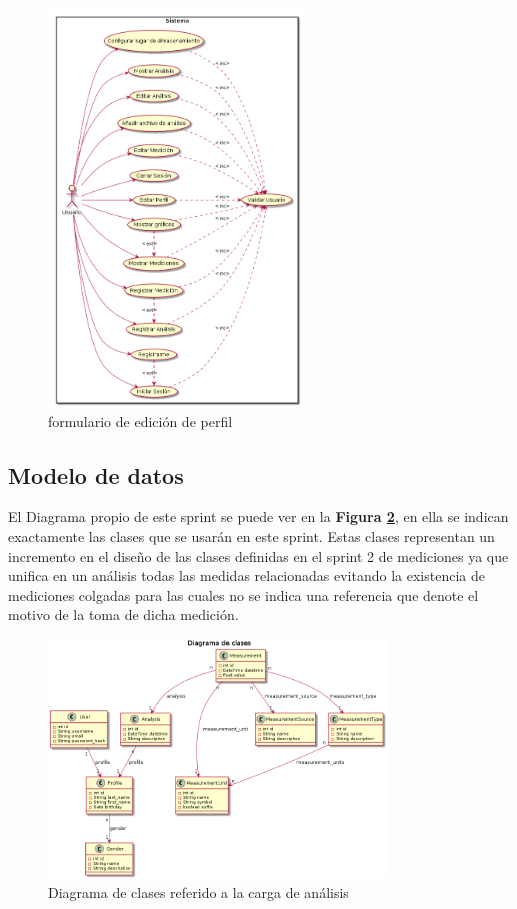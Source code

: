 \begin{figure}[h]
	\centering
	\includegraphics[width=0.6\textwidth]{img/6-cu}
	\caption{formulario de edición de perfil}
	\label{6-cu}
\end{figure}

\clearpage

\subsection{Modelo de datos}
El Diagrama propio de este sprint se puede ver en la \textbf{Figura \ref{5-diagramaClases}}, en ella se indican exactamente las clases que se usarán en este sprint. Estas clases representan un incremento en el diseño de las clases definidas en el sprint 2 de mediciones ya que unifica en un análisis todas las medidas relacionadas evitando la existencia de mediciones colgadas para las cuales no se indica una referencia que denote el motivo de la toma de dicha medición.

    \begin{figure}[h]
        \centering
        \includegraphics[width=0.8\textwidth]{img/sprint5_dc}
        \caption{Diagrama de clases referido a la carga de análisis}
		\label{5-diagramaClases}
    \end{figure}


